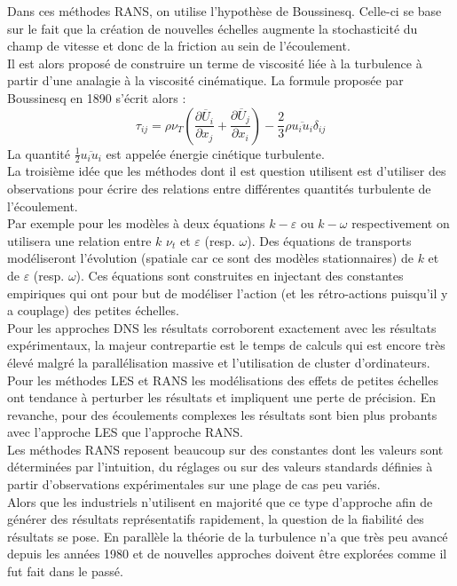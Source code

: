 \documentclass[a4paper,12pt]{article}
\newcommand{\bepar}[1]{
	\left( #1 \right)  
}
\newcommand{\keps}{$k-\varepsilon$}
\numberwithin{equation}{section} %
\begin{document}
  \noindent Dans ces méthodes RANS, on utilise l'hypothèse de Boussinesq. Celle-ci se base sur le fait que la création de nouvelles échelles augmente la stochasticité du champ de vitesse et donc de la friction au sein de l'écoulement.\\
  Il est alors proposé de construire un terme de viscosité liée à la turbulence à partir d'une analagie à la viscosité cinématique. La formule proposée par Boussinesq en 1890 s'écrit alors : 
\begin{equation}
\tau_{ij} = \rho \nu_T\bepar{\frac{\partial \overline{U}_i}{\partial x_j} + \frac{\partial \overline{U}_j}{\partial x_i}} - \frac{2}{3} \rho \overline{u_iu_i} \delta_{ij} \label{boussi}
\end{equation} 
   La quantité $\frac{1}{2}\overline{u_iu_i} $ est appelée énergie cinétique turbulente.\\La troisième idée que les méthodes dont il est question utilisent est d'utiliser des observations pour écrire des relations entre différentes quantités turbulente de l'écoulement. \\
Par exemple pour les modèles à deux équations \keps $ $ ou $k-\omega$ respectivement on utilisera une relation entre $k$ $\nu_t$ et $\varepsilon$ (resp. $\omega$). Des équations de transports modéliseront l'évolution (spatiale car ce sont des modèles stationnaires) de $k$ et de $\varepsilon$ (resp. $\omega$). Ces équations sont construites en injectant des constantes empiriques qui ont pour but de modéliser l'action (et les rétro-actions puisqu'il y a couplage) des petites échelles.\\

Pour les approches DNS les résultats corroborent exactement avec les résultats expérimentaux, la majeur contrepartie est le temps de calculs qui est encore très élevé malgré la parallélisation massive et l'utilisation de cluster d'ordinateurs. \\
Pour les méthodes LES et RANS les modélisations des effets de petites échelles ont tendance à perturber les résultats et impliquent une perte de précision. En revanche, pour des écoulements complexes les résultats sont bien plus probants avec l'approche LES que l'approche RANS.\\
Les méthodes RANS reposent beaucoup sur des constantes dont les valeurs sont déterminées par l'intuition, du réglages ou sur des valeurs standards définies à partir d'observations expérimentales sur une plage de cas peu variés.\\
Alors que les industriels n'utilisent en majorité que ce type d'approche afin de générer des résultats représentatifs rapidement, la question de la fiabilité des résultats se pose. En parallèle la théorie de la turbulence n'a que très peu avancé depuis les années 1980 et de nouvelles approches doivent être explorées comme il fut fait dans le passé.\\
\end{document}
